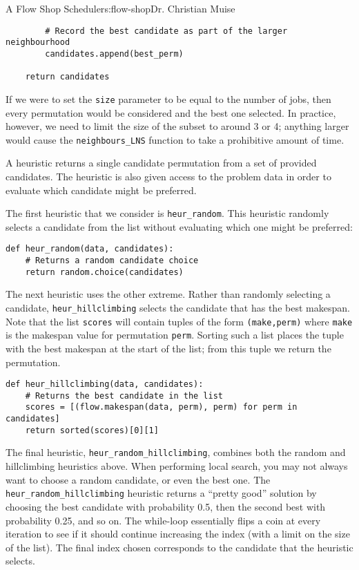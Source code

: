 \begin{aosachapter}{A Flow Shop Scheduler}{s:flow-shop}{Dr. Christian Muise}
\begin{verbatim}
        # Record the best candidate as part of the larger neighbourhood
        candidates.append(best_perm)

    return candidates
\end{verbatim}

If we were to set the \texttt{size} parameter to be equal to the number
of jobs, then every permutation would be considered and the best one
selected. In practice, however, we need to limit the size of the subset
to around 3 or 4; anything larger would cause the
\texttt{neighbours\_LNS} function to take a prohibitive amount of time.

\label{heuristics}

A heuristic returns a single candidate permutation from a set of
provided candidates. The heuristic is also given access to the problem
data in order to evaluate which candidate might be preferred.

The first heuristic that we consider is \texttt{heur\_random}. This
heuristic randomly selects a candidate from the list without evaluating
which one might be preferred:

\begin{verbatim}
def heur_random(data, candidates):
    # Returns a random candidate choice
    return random.choice(candidates)
\end{verbatim}

The next heuristic uses the other extreme. Rather than randomly
selecting a candidate, \texttt{heur\_hillclimbing} selects the candidate
that has the best makespan. Note that the list \texttt{scores} will
contain tuples of the form \texttt{(make,perm)} where \texttt{make} is
the makespan value for permutation \texttt{perm}. Sorting such a list
places the tuple with the best makespan at the start of the list; from
this tuple we return the permutation.

\begin{verbatim}
def heur_hillclimbing(data, candidates):
    # Returns the best candidate in the list
    scores = [(flow.makespan(data, perm), perm) for perm in candidates]
    return sorted(scores)[0][1]
\end{verbatim}

The final heuristic, \texttt{heur\_random\_hillclimbing}, combines both
the random and hillclimbing heuristics above. When performing local
search, you may not always want to choose a random candidate, or even
the best one. The \texttt{heur\_random\_hillclimbing} heuristic returns
a ``pretty good'' solution by choosing the best candidate with
probability 0.5, then the second best with probability 0.25, and so on.
The while-loop essentially flips a coin at every iteration to see if it
should continue increasing the index (with a limit on the size of the
list). The final index chosen corresponds to the candidate that the
heuristic selects.


\end{aosachapter}
